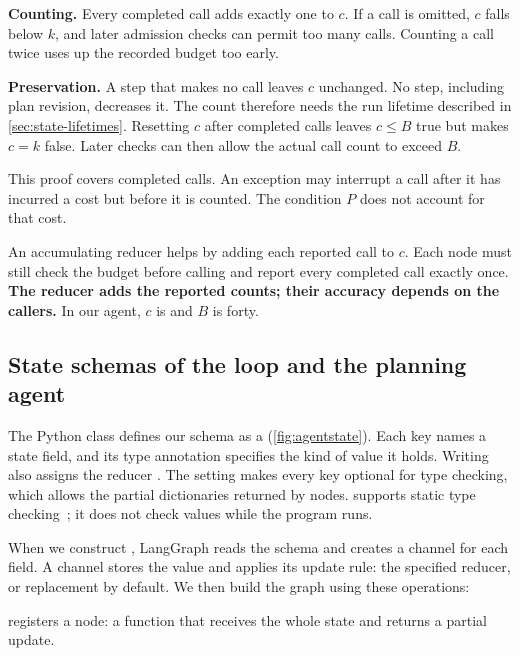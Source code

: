 \item \textbf{Counting.} Every completed call adds exactly one to $c$. If a call is omitted,
$c$ falls below $k$, and later admission checks can permit too many calls. Counting a call twice
uses up the recorded budget too early.

\item \textbf{Preservation.} A step that makes no call leaves $c$ unchanged. No step, including
plan revision, decreases it. The count therefore needs the run lifetime described in
\cref{sec:state-lifetimes}. Resetting $c$ after completed calls leaves $c \leq B$ true but makes
$c = k$ false. Later checks can then allow the actual call count to exceed $B$.

\ei

This proof covers completed calls. An exception may interrupt a call after it has incurred a
cost but before it is counted. The condition $P$ does not account for that cost.

An accumulating reducer helps by adding each reported call to $c$. Each node must still check
the budget before calling and report every completed call exactly once. \textbf{The reducer
adds the reported counts; their accuracy depends on the callers.} In our agent, $c$ is
 and $B$ is forty.

\subsection{State schemas of the loop and the planning agent}
\label{sec:state-demo}

The Python class  defines our schema as a 
(\cref{fig:agentstate}). Each key names a state field, and its type annotation specifies the
kind of value it holds. Writing  also assigns the reducer
. The setting  makes every key optional for type checking,
which allows the partial dictionaries returned by nodes.  supports static
type checking~\citep{pep589}; it does not check values while the program runs.

When we construct , LangGraph reads the schema and creates a
channel for each field. A channel stores the value and applies its update rule: the specified
reducer, or replacement by default. We then build the graph using these operations:

\bi

\item {} registers a node: a function that receives the whole state and
returns a partial update.

